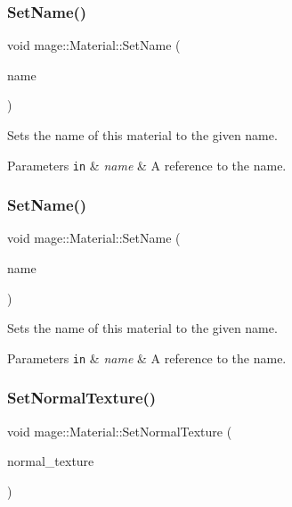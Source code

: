 \subsubsection{\texorpdfstring{Set\+Name()}{SetName()}\hspace{0.1cm}{\footnotesize\ttfamily [1/2]}}
{\footnotesize\ttfamily void mage\+::\+Material\+::\+Set\+Name (\begin{DoxyParamCaption}\item[{const string \&}]{name }\end{DoxyParamCaption})}

Sets the name of this material to the given name.


\begin{DoxyParams}[1]{Parameters}
\mbox{\tt in}  & {\em name} & A reference to the name. \\
\hline
\end{DoxyParams}
\hypertarget{structmage_1_1_material_ad612e4174b030bb002cedaf054e18f82}{}\label{structmage_1_1_material_ad612e4174b030bb002cedaf054e18f82} 
\subsubsection{\texorpdfstring{Set\+Name()}{SetName()}\hspace{0.1cm}{\footnotesize\ttfamily [2/2]}}
{\footnotesize\ttfamily void mage\+::\+Material\+::\+Set\+Name (\begin{DoxyParamCaption}\item[{string \&\&}]{name }\end{DoxyParamCaption})}

Sets the name of this material to the given name.


\begin{DoxyParams}[1]{Parameters}
\mbox{\tt in}  & {\em name} & A reference to the name. \\
\hline
\end{DoxyParams}
\hypertarget{structmage_1_1_material_a61b695303632bd8fd1399c63e746319e}{}\label{structmage_1_1_material_a61b695303632bd8fd1399c63e746319e} 
\subsubsection{\texorpdfstring{Set\+Normal\+Texture()}{SetNormalTexture()}}
{\footnotesize\ttfamily void mage\+::\+Material\+::\+Set\+Normal\+Texture (\begin{DoxyParamCaption}\item[{\hyperlink{namespacemage_a1e01ae66713838a7a67d30e44c67703e}{Shared\+Ptr}$<$ \hyperlink{classmage_1_1_texture}{Texture} $>$}]{normal\+\_\+texture }\end{DoxyParamCaption})}

